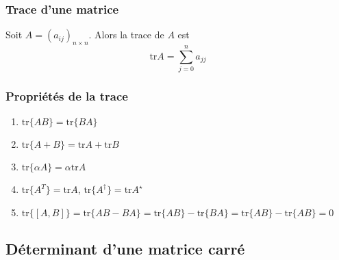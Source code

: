 \subsubsection{Trace d'une matrice}
Soit $A = (a_{ij})_{n \times n}$. Alors la trace de $A$ est
\[ \text{tr} A =  \sum_{j = 0}^{n} a_{jj} \]

\subsubsection{Propriétés de la trace}
\begin{enumerate}
    \item $\text{tr}\{ AB \} = \text{tr}\{ BA \}$
    \item $\text{tr}\{ A + B \} = \text{tr}A + \text{tr}B$
    \item $\text{tr}\{ \alpha A \} = \alpha \text{tr}A $
    \item $\text{tr}\{ A^T \} = \text{tr}A$, $\text{tr}\{ A^\dagger \} = \text{tr}A^\star$
    \item $\text{tr}\{ [A, B] \} = \text{tr}\{ AB - BA \} = \text{tr}\{ AB \} - \text{tr}\{BA\} = \text{tr}\{ AB \} - \text{tr}\{AB\} = 0$
\end{enumerate}

\subsection{Déterminant d'une matrice carré}

